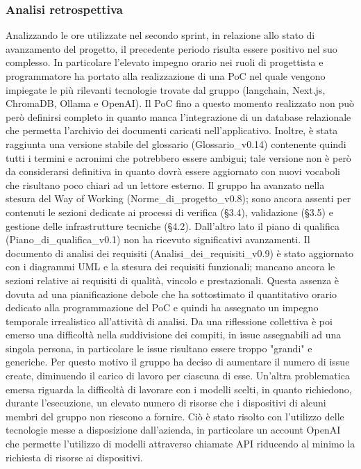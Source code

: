 \newpage
\subsubsection{Analisi retrospettiva}
Analizzando le ore utilizzate nel secondo sprint, in relazione allo stato di avanzamento del progetto, il precedente periodo risulta essere positivo nel suo complesso. In particolare l'elevato impegno orario nei ruoli di progettista e programmatore ha portato alla realizzazione di una PoC nel quale vengono impiegate le più rilevanti tecnologie trovate dal gruppo (langchain, Next.js, ChromaDB, Ollama e OpenAI). Il PoC fino a questo momento realizzato non può però definirsi completo in quanto manca l'integrazione di un database relazionale che permetta l'archivio dei documenti caricati nell'applicativo. Inoltre, è stata raggiunta una versione stabile del glossario (Glossario\_v0.14) contenente quindi tutti i termini e acronimi che potrebbero essere ambigui; tale versione non è però da considerarsi definitiva in quanto dovrà essere aggiornato con nuovi vocaboli che risultano poco chiari ad un lettore esterno. Il gruppo ha avanzato nella stesura del Way of Working (Norme\_di\_progetto\_v0.8); sono ancora assenti per contenuti le sezioni dedicate ai processi di verifica (§3.4),  validazione (§3.5) e gestione delle infrastrutture tecniche (§4.2). Dall'altro lato il piano di qualifica (Piano\_di\_qualifica\_v0.1) non ha ricevuto significativi avanzamenti. Il documento di analisi dei requisiti (Analisi\_dei\_requisiti\_v0.9) è stato aggiornato con i diagrammi UML e la stesura dei requisiti funzionali; mancano ancora le sezioni relative ai requisiti di qualità, vincolo e prestazionali. Questa assenza è dovuta ad una pianificazione debole che ha sottostimato il quantitativo orario dedicato alla programmazione del PoC e quindi ha assegnato un impegno temporale irrealistico all'attività di analisi. Da una riflessione collettiva è poi emerso una difficoltà nella suddivisione dei compiti, in issue assegnabili ad una singola persona, in particolare le issue risultano essere troppo "grandi" e generiche. Per questo motivo il gruppo ha deciso di aumentare il numero di issue create, diminuendo il carico di lavoro per ciascuna di esse. Un'altra problematica emersa riguarda la difficoltà di lavorare con i modelli scelti, in quanto richiedono, durante l'esecuzione, un elevato numero di risorse che i dispositivi di alcuni membri del gruppo non riescono a fornire. Ciò è stato risolto con l'utilizzo delle tecnologie messe a disposizione dall'azienda, in particolare un account OpenAI che permette l'utilizzo di modelli attraverso chiamate API riducendo al minimo la richiesta di risorse ai dispositivi.
\newpage

